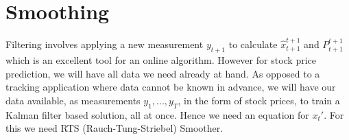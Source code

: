 \section{Smoothing}

Filtering involves applying a new measurement $y_{t+1}$ to calculate
$\hat{x}_{t+1}^{t+1}$ and $P_{t+1}^{t+1}$ which is an excellent tool for an
online algorithm. However for stock price prediction, we will have all data we
need already at hand. As opposed to a tracking application where data cannot be
known in advance, we will have our data available, as measurements
$y_1,...,y_T$, in the form of stock prices, to train a Kalman filter based
solution, all at once. Hence we need an equation for $x_{t}'$. For this we need
RTS (Rauch-Tung-Striebel) Smoother.

